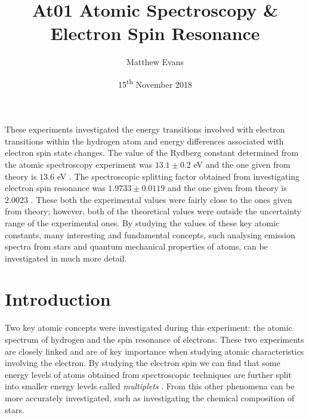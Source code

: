 \documentclass{article}
\begin{document}
\title{At01 Atomic Spectroscopy \& Electron Spin Resonance} %
\author{Matthew Evans}%
\date{15\textsuperscript{th} November 2018} %
\maketitle %

\begin{onecolabstract}
\noindent
These experiments investigated the energy transitions involved with electron transitions within the hydrogen atom and energy differences associated with electron spin state changes. The value of the Rydberg constant determined from the atomic spectroscopy experiment was $13.1 \pm 0.2$ eV and the one given from theory is $13.6$ eV \cite{Paper01}. The spectroscopic splitting factor obtained from investigating electron spin resonance was $1.9733 \pm 0.0119$ and the one given from theory is $2.0023$ \cite{Paper02}. These both the experimental values were fairly close to the ones given from theory; however, both of the theoretical values were outside the uncertainty range of the experimental ones. By studying the values of these key atomic constants, many interesting and fundamental concepts, such analysing emission spectra from stars and quantum mechanical properties of atoms, can be investigated in much more detail.

\end{onecolabstract}
\vspace{5mm} %


\section{Introduction}
\label{sec:introduction}

Two key atomic concepts were investigated during this experiment: the atomic spectrum of hydrogen and the spin resonance of electrons. These two experiments are closely linked and are of key importance when studying atomic characteristics involving the electron. By studying the electron spin we can find that some energy levels of atoms obtained from spectroscopic techniques are further split into smaller energy levels called \textit{multiplets} \cite{Book01}. From this other phenomena can be more accurately investigated, such as investigating the chemical composition of stars. 
\end{document}
